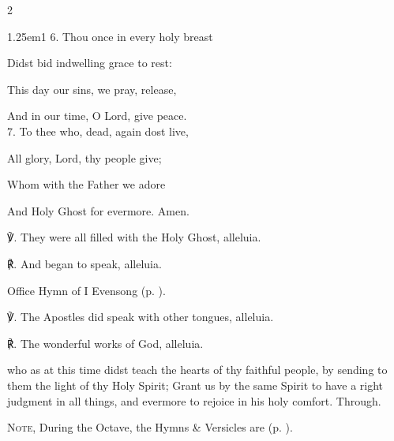 \begin{paracol}{2}
\begin{hangparas}{1.25em}{1}
6. Thou once in every holy breast

Didst bid indwelling grace to rest:

This day our sins, we pray, release,

And in our time, O Lord, give peace.\\

7. To thee who, dead, again dost live,

All glory, Lord, thy people give;

Whom with the Father we adore

And Holy Ghost for evermore. Amen.\\
\end{hangparas}

℣. They were all filled with the Holy Ghost, alleluia.

℟. And began to speak, alleluia.


\fussy
\end{paracol}

\secondEvensong
{}

\begin{rubric}
	Office Hymn of I Evensong (p. \pageref{WhitsundayEvensongHymn}).
\end{rubric}

℣. The Apostles did speak with other tongues, alleluia.

℟. The wonderful works of God, alleluia.


\collect
{} who as at this time didst teach the hearts of thy faithful people, by sending to them the light of thy Holy Spirit; Grant us by the same Spirit to have a right judgment in all things, and evermore to rejoice in his holy comfort. Through.

\begin{rubric}
	\textsc{Note,} During the Octave, the Hymns \& Versicles are  (p. \pageref{Whitsunday}).
\end{rubric}



